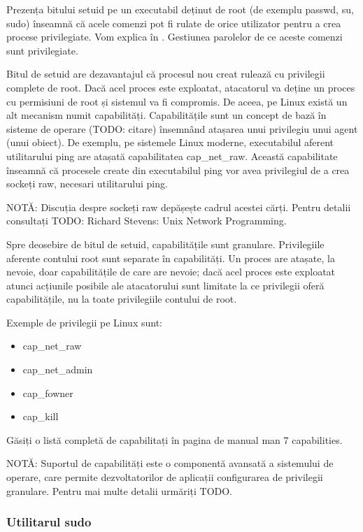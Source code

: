 Prezența bitului setuid pe un executabil deținut de root (de exemplu passwd, su,
sudo) înseamnă că acele comenzi pot fi rulate de orice utilizator pentru a crea
procese privilegiate. Vom explica în .
Gestiunea parolelor de ce aceste comenzi sunt privilegiate.

Bitul de setuid are dezavantajul că procesul nou creat rulează cu privilegii
complete de root. Dacă acel proces este exploatat, atacatorul va deține un
proces cu permisiuni de root și sistemul va fi compromis. De aceea, pe Linux
există un alt mecanism numit capabilități. Capabilitățile sunt un concept de
bază în sisteme de operare (TODO: citare) însemnând atașarea unui privilegiu
unui agent (unui obiect). De exemplu, pe sistemele Linux moderne, executabilul
aferent utilitarului ping are atașată capabilitatea cap_net_raw. Această
capabilitate înseamnă că procesele create din executabilul ping vor avea
privilegiul de a crea sockeți raw, necesari utilitarului ping.

NOTĂ: Discuția despre sockeți raw depășește cadrul acestei cărți. Pentru detalii
consultați TODO: Richard Stevens: Unix Network Programming.

Spre deosebire de bitul de setuid, capabilitățile sunt granulare. Privilegiile
aferente contului root sunt separate în capabilități. Un proces are atașate, la
nevoie, doar capabilitățile de care are nevoie; dacă acel proces este exploatat
atunci acțiunile posibile ale atacatorului sunt limitate la ce privilegii oferă
capabilitățile, nu la toate privilegiile contului de root.

Exemple de privilegii pe Linux sunt:

\begin{itemize}
	\item cap_net_raw
	\item cap_net_admin
	\item cap_fowner
	\item cap_kill
\end{itemize}

Găsiți o listă completă de capabilitați în pagina de manual man 7 capabilities.

NOTĂ: Suportul de capabilități este o componentă avansată a sistemului de
operare, care permite dezvoltatorilor de aplicații configurarea de privilegii
granulare. Pentru mai multe detalii urmăriți TODO.

\subsubsection{Utilitarul sudo}
\label{sec:users-superuser-altroot-sudo}

